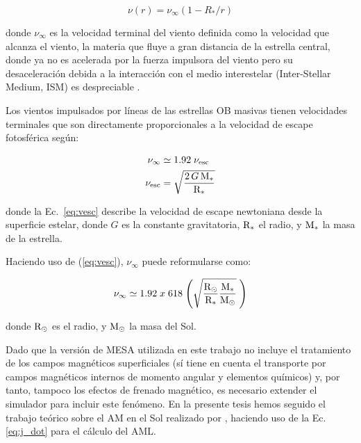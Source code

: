 \begin{ceqn}
\begin{equation}
    \nu(r) = \nu_\infty (1-R_*/r) \label{eq:vel_law}
\end{equation}
\end{ceqn}
donde $\nu_\infty$ es la velocidad terminal del viento definida como la velocidad que alcanza el viento, la materia que fluye a gran distancia de la estrella central, donde ya no es acelerada por la fuerza impulsora del viento pero su desaceleración debida a la interacción con el medio interestelar (Inter-Stellar Medium, ISM) es despreciable \cite{Niedzielski2002}.\par

Los vientos impulsados por líneas de las estrellas OB masivas tienen velocidades terminales que son directamente proporcionales a la velocidad de escape fotosférica \cite{Lamers2000} según:\par

\begin{ceqn}
\begin{align}
    \nu_\infty &\simeq 1.92 \;\nu_{\textrm{esc}} \label{eq:vinf}\\
    \nu_{\textrm{esc}} &= \sqrt{\frac{2\,G\,\mathrm{M}_*}{\mathrm{R}_*}} \label{eq:vesc}
\end{align}
\end{ceqn}

donde la Ec.~\ref{eq:vesc} describe la velocidad de escape newtoniana desde la superficie estelar, donde $G$ es la constante gravitatoria, ${\mathrm{R}_*}$ el radio, y ${\mathrm{M}_*}$ la masa de la estrella.

Haciendo uso de (\ref{eq:vesc}), $\nu_\infty$ puede reformularse como:
\begin{ceqn}
\begin{equation}
    \nu_\infty \simeq 1.92 \; x \; 618 \; \Bigg(\sqrt{\frac{\mathrm{R}_\odot}{\mathrm{R}_*}\frac{\mathrm{M}_*}{\mathrm{M}_\odot}} \;\Bigg) \label{eq:vinf}
\end{equation}
\end{ceqn}
donde ${\mathrm{R}_\odot}$ es el radio, y ${\mathrm{M}_\odot}$ la masa del Sol.


Dado que la versión de MESA utilizada en este trabajo no incluye el tratamiento de los campos magnéticos superficiales (sí tiene en cuenta el transporte por campos magnéticos internos de momento angular y elementos químicos) y, por tanto, tampoco los efectos de frenado magnético, es necesario extender el simulador para incluir este fenómeno. En la presente tesis hemos seguido el trabajo teórico sobre el AM en el Sol realizado por \cite{Weber1967}, haciendo uso de la Ec.~ \ref{eq:j_dot} para el cálculo del AML.\par

